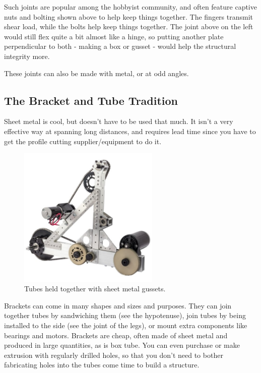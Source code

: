 \documentclass[10pt,letterpaper]{book}
\begin{document}
	Such joints are popular among the hobbyist community, and often feature captive nuts and bolting shown above to help keep things together. The fingers transmit shear load, while the bolts help keep things together. The joint above on the left would still flex quite a bit almost like a hinge, so putting another plate perpendicular to both - making a box or gusset - would help the structural integrity more.
	
	These joints can also be made with metal, or at odd angles.
	
	\subsection{The Bracket and Tube Tradition}
	Sheet metal is cool, but doesn't have to be used that much. It isn't a very effective way at spanning long distances, and requires lead time since you have to get the profile cutting supplier/equipment to do it.
	
	\begin{figure}[H]
		\includegraphics[width=0.6\textwidth]{imgs/tradition_gussetbox.jpeg}
		\caption{Tubes held together with sheet metal gussets.}
	\end{figure}
	
	Brackets can come in many shapes and sizes and purposes. They can join together tubes by sandwiching them (see the hypotenuse), join tubes by being installed to the side (see the joint of the legs), or mount extra components like bearings and motors. Brackets are cheap, often made of sheet metal and produced in large quantities, as is box tube. You can even purchase or make extrusion with regularly drilled holes, so that you don't need to bother fabricating holes into the tubes come time to build a structure.
	
\end{document}
